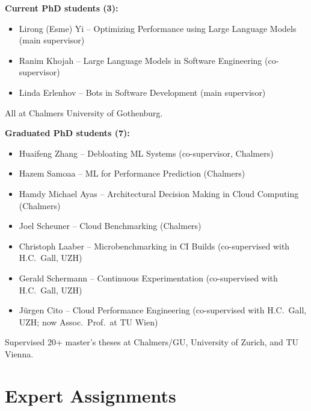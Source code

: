 \documentclass[a4paper,11pt]{article}
\begin{document}
\noindent\textbf{Current PhD students (3):}
\begin{itemize}
  \item Lirong (Esme) Yi -- Optimizing Performance using Large Language Models (main supervisor)
  \item Ranim Khojah -- Large Language Models in Software Engineering (co-supervisor)
  \item Linda Erlenhov -- Bots in Software Development (main supervisor)
\end{itemize}
All at Chalmers \textbar{} University of Gothenburg.\medskip

\noindent\textbf{Graduated PhD students (7):}
\begin{itemize}
  \item Huaifeng Zhang -- Debloating ML Systems (co-supervisor, Chalmers)
  \item Hazem Samoaa -- ML for Performance Prediction (Chalmers)
  \item Hamdy Michael Ayas -- Architectural Decision Making in Cloud Computing (Chalmers)
  \item Joel Scheuner -- Cloud Benchmarking (Chalmers)
  \item Christoph Laaber -- Microbenchmarking in CI Builds (co-supervised with H.C.\ Gall, UZH)
  \item Gerald Schermann -- Continuous Experimentation (co-supervised with H.C.\ Gall, UZH)
  \item Jürgen Cito -- Cloud Performance Engineering (co-supervised with H.C.\ Gall, UZH; now Assoc.\ Prof.\ at TU Wien)
\end{itemize}

\noindent Supervised 20+ master's theses at Chalmers/GU, University of Zurich, and TU Vienna.

\section{Expert Assignments}
\end{document}
